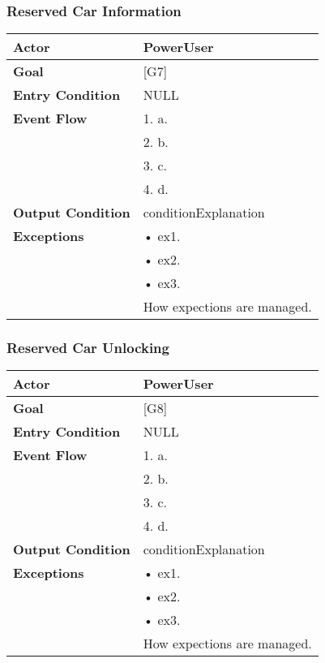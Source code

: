 \subsubsection{Reserved Car Information}
\begin{tabular}{| l | p{8cm} |}
\hline
\textbf{Actor}      &       PowerUser \\
\hline
\textbf{Goal}       &       [G7]\\
\hline
\textbf{Entry Condition} &  NULL\\
\hline
\textbf{Event Flow}     &   1.	a.\\&
                                            2.	b.\\&
                                            3.	c.\\&
                                            4.  d.\\
\hline
\textbf{Output Condition} & conditionExplanation\\
\hline
\textbf{Exceptions} &       •   ex1.\\& 
                            •	ex2.\\&
                            •	ex3.\\& 
                           How expections are managed.\\
\hline
\end{tabular} 


\subsubsection{Reserved Car Unlocking}
\begin{tabular}{| l | p{8cm} |}
\hline
\textbf{Actor}      &       PowerUser \\
\hline
\textbf{Goal}       &       [G8]\\
\hline
\textbf{Entry Condition} &  NULL\\
\hline
\textbf{Event Flow}     &   1.	a.\\&
                                            2.	b.\\&
                                            3.	c.\\&
                                            4.  d.\\
\hline
\textbf{Output Condition} & conditionExplanation\\
\hline
\textbf{Exceptions} &       •   ex1.\\& 
                            •	ex2.\\&
                            •	ex3.\\& 
                           How expections are managed.\\
\hline
\end{tabular} 


